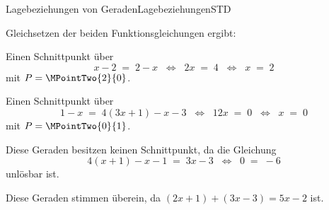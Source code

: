 \begin{MXContent}{Lagebeziehungen von Geraden}{Lagebeziehungen}{STD}
\begin{MExercise}

\begin{MHint}{\iSolution}
Gleichsetzen der beiden Funktionsgleichungen ergibt:
\begin{MExerciseItems}
\item{Einen Schnittpunkt über
$$
x-2 \;=\; 2-x \;\; \Leftrightarrow\;\; 2x\;=\; 4 \;\; \Leftrightarrow\;\; x \;=\; 2
$$
mit $P=\MPointTwo{2}{0}$.}
\item{Einen Schnittpunkt über
$$
1-x \;=\; 4(3x+1)-x-3 \;\; \Leftrightarrow\;\; 12x\;=\; 0 \;\; \Leftrightarrow\;\; x \;=\; 0
$$
mit $P=\MPointTwo{0}{1}$.}
\item{Diese Geraden besitzen keinen Schnittpunkt, da die Gleichung
$$
4(x+1)-x-1 \;=\; 3x-3\;\; \Leftrightarrow\;\; 0\;=\; -6 
$$
unlösbar ist.}
\item{Diese Geraden stimmen überein, da $(2x+1)+(3x-3)=5x-2$ ist.}
\end{MExerciseItems}
\end{MHint}


\end{MExercise}
\end{MXContent}
